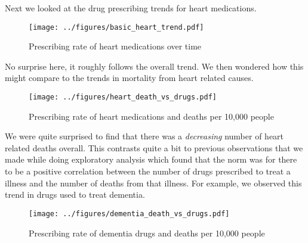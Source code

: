 \documentclass[a4paper]{article}
\begin{document}
		Next we looked at the drug prescribing trends for heart medications. 

\begin{figure}[H]
	\centering
	\texttt{[image: ../figures/basic\_heart\_trend.pdf]}  
	\caption{Prescribing rate of heart medications over time}
	\label{heart_meds_basic}
\end{figure}

		No surprise here, it roughly follows the overall trend. 
		We then wondered how this might compare to the trends in mortality from 
		heart related causes. 

\begin{figure}[H]
	\centering
	\texttt{[image: ../figures/heart\_death\_vs\_drugs.pdf]}  
	\caption{Prescribing rate of heart medications and deaths per 10,000 people}
	\label{heart_death_vs_drugs}
\end{figure}


		We were quite surprised to find that there was a \emph{decreasing} number of 
		heart related deaths overall. This contrasts quite a bit to previous observations
		that we made while doing exploratory analysis which found that the norm was
		for there to be a positive correlation between the number of drugs prescribed to 
		treat a illness and the number of deaths from that illness. For example, 
		we observed this trend in drugs used to treat dementia.


\begin{figure}[H]
	\centering
	\texttt{[image: ../figures/dementia\_death\_vs\_drugs.pdf]}  
	\caption{Prescribing rate of dementia drugs and deaths per 10,000 people}
	\label{deme_death_vs_drugs}
\end{figure}




\end{document}
